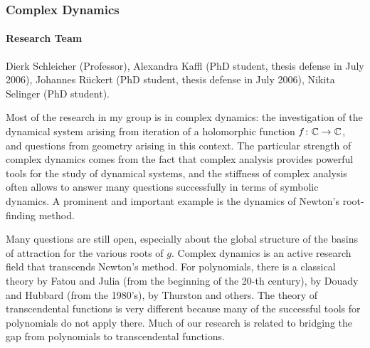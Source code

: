 

\subsubsection{Complex Dynamics }

\paragraph{Research Team}

Dierk Schleicher (Professor), Alexandra Kaffl (PhD student, thesis
defense in July 2006), Johannes R\"uckert (PhD student, thesis
defense in July 2006), Nikita Selinger (PhD student).

\medskip


Most of the research in my group is in complex dynamics: the
investigation of the dynamical system arising from iteration of a
holomorphic function $f\colon\mathbb{C}\to\mathbb{C}$, and questions from geometry
arising in this context. The particular strength of complex dynamics
comes from the fact that complex analysis provides powerful tools
for the study of dynamical systems, and the stiffness of complex
analysis often allows to answer many questions successfully in terms
of symbolic dynamics. A prominent and important example is the
dynamics of Newton's root-finding method.

Many questions are still open, especially about the global structure
of the basins of attraction for the various roots of $g$.
Complex dynamics is an active research field that transcends
Newton's me\-thod. For polynomials, there is a classical theory by
Fatou and Julia (from the beginning of the 20-th century), by Douady
and Hubbard (from the 1980's), by Thurston and others. The theory of
transcendental functions is very different because many of the
successful tools for polynomials do not apply there. Much of our
research is related to bridging the gap from polynomials to
transcendental functions.



